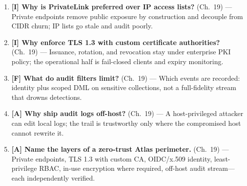\begin{enumerate}
    \item \textbf{[I] Why is PrivateLink preferred over IP access lists?} (Ch.~19) --- Private endpoints remove public exposure by construction and decouple from CIDR churn; IP lists go stale and audit poorly.
    \item \textbf{[I] Why enforce TLS 1.3 with custom certificate authorities?} (Ch.~19) --- Issuance, rotation, and revocation stay under enterprise PKI policy; the operational half is fail-closed clients and expiry monitoring.
    \item \textbf{[F] What do audit filters limit?} (Ch.~19) --- Which events are recorded: identity plus scoped DML on sensitive collections, not a full-fidelity stream that drowns detections.
    \item \textbf{[A] Why ship audit logs off-host?} (Ch.~19) --- A host-privileged attacker can edit local logs; the trail is trustworthy only where the compromised host cannot rewrite it.
    \item \textbf{[A] Name the layers of a zero-trust Atlas perimeter.} (Ch.~19) --- Private endpoints, TLS 1.3 with custom CA, OIDC/x.509 identity, least-privilege RBAC, in-use encryption where required, off-host audit stream---each independently verified.
\end{enumerate}

